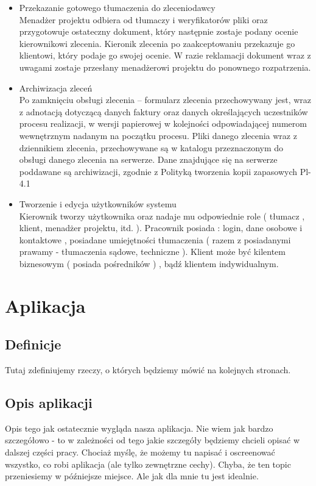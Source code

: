 \documentclass[licencjacka]{pracamgr}
\begin{document}
\begin{itemize}
\item Przekazanie gotowego tłumaczenia do zleceniodawcy\\
Menadżer projektu odbiera od tłumaczy i weryfikatorów pliki oraz przygotowuje ostateczny dokument, który następnie zostaje podany ocenie kierownikowi zlecenia.
Kieronik zlecenia po zaakceptowaniu przekazuje go klientowi, który podaje go swojej ocenie. W razie reklamacji dokument wraz z uwagami zostaje przesłany 
menadżerowi projektu do ponownego rozpatrzenia.

\item Archiwizacja zleceń\\
Po zamknięciu obsługi zlecenia – formularz zlecenia przechowywany jest,
wraz z adnotacją dotyczącą danych faktury oraz danych określających uczestników 
procesu realizacji, w wersji papierowej w kolejności odpowiadającej numerom 
wewnętrznym nadanym na początku procesu.
Pliki danego zlecenia wraz z dziennikiem zlecenia, przechowywane są w 
katalogu przeznaczonym do obsługi danego zlecenia na serwerze.
Dane znajdujące się na serwerze poddawane są archiwizacji, zgodnie z 
Polityką tworzenia kopii zapasowych Pl-4.1

\item Tworzenie i edycja użytkowników systemu\\
Kierownik tworzy użytkownika oraz nadaje mu odpowiednie role ( tłumacz , klient, menadżer projektu, itd. ).
Pracownik posiada : login, dane osobowe i kontaktowe , posiadane umiejętności tłumaczenia ( razem z posiadanymi prawamy - tłumaczenia sądowe, techniczne ).
Klient może być kilentem biznesowym ( posiada pośredników ) , bądź klientem indywidualnym.

\end{itemize}

\chapter{Aplikacja}
\section{Definicje}
Tutaj zdefiniujemy rzeczy, o których będziemy mówić na kolejnych stronach.
\section{Opis aplikacji}
Opis tego jak ostatecznie wygląda nasza aplikacja. Nie wiem jak bardzo szczegółowo - to w zależności od tego jakie szczegóły będziemy chcieli opisać w dalszej części pracy. Chociaż myślę, że możemy tu napisać i oscreenować wszystko, co robi aplikacja (ale tylko zewnętrzne cechy). Chyba, że ten topic przeniesiemy w późniejsze miejsce. Ale jak dla mnie tu jest idealnie.
\end{document}
